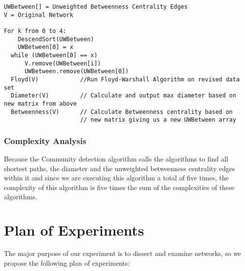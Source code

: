 \documentclass{article}
\begin{document}
\begin{verbatim}
UWBetween[] = Unweighted Betweenness Centrality Edges
V = Original Network

For k from 0 to 4:
    DescendSort(UWBetween)
    UWBetween[0] = x
  while (UWBetween[0] == x)
      V.remove(UWBetween[i])
      UWBetween.remove(UWBetween[0])
  Floyd(V)            //Run Floyd-Warshall Algorithm on revised data set
  Diameter(V)         // Calculate and output max diameter based on new matrix from above
  Betweenness(V)      // Calculate Betweenness centrality based on
                      // new matrix giving us a new UWBetween array
\end{verbatim}

\subsubsection{Complexity Analysis}
Because the Community detection algorithm calls the algorithms to find all shortest paths, the diameter and the unweighted betweenness centrality edges within it and since we are executing this algorithm a total of five times, the complexity of this algorithm is five times the sum of the complexities of these algorithms.

\section{Plan of Experiments}
The major purpose of our experiment is to dissect and examine networks, so we propose the following plan of experiments:
\end{document}
